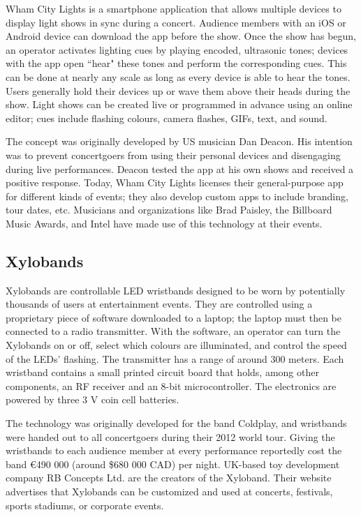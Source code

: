 Wham City Lights is a smartphone application that allows multiple devices to display light shows in sync during a concert. Audience members with an iOS or Android device can download the app before the show. Once the show has begun, an operator activates lighting cues by playing encoded, ultrasonic tones; devices with the app open ``hear" these tones and perform the corresponding cues. This can be done at nearly any scale as long as every device is able to hear the tones. Users generally hold their devices up or wave them above their heads during the show. Light shows can be created live or programmed in advance using an online editor; cues include flashing colours, camera flashes, GIFs, text, and sound.

The concept was originally developed by US musician Dan Deacon. His intention was to prevent concertgoers from using their personal devices and disengaging during live performances. Deacon tested the app at his own shows and received a positive response. Today, Wham City Lights licenses their general-purpose app for different kinds of events; they also develop custom apps to include branding, tour dates, etc. Musicians and organizations like Brad Paisley, the Billboard Music Awards, and Intel have made use of this technology at their events.

\subsection{Xylobands}

Xylobands are controllable LED wristbands designed to be worn by potentially thousands of users at entertainment events. They are controlled using a proprietary piece of software downloaded to a laptop; the laptop must then be connected to a radio transmitter. With the software, an operator can turn the Xylobands on or off, select which colours are illuminated, and control the speed of the LEDs' flashing. The transmitter has a range of around 300 meters. Each wristband contains a small printed circuit board that holds, among other components, an RF receiver and an 8-bit microcontroller. The electronics are powered by three 3 V coin cell batteries.

The technology was originally developed for the band Coldplay, and wristbands were handed out to all concertgoers during their 2012 world tour. Giving the wristbands to each audience member at every performance reportedly cost the band \euro{}490 000 (around \$680 000 CAD) per night. UK-based toy development company RB Concepts Ltd. are the creators of the Xyloband. Their website advertises that Xylobands can be customized and used at concerts, festivals, sports stadiums, or corporate events.


